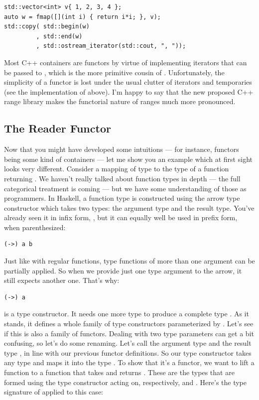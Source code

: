 \begin{Verbatim}[commandchars=\\\{\}]
std::vector<int> v{ 1, 2, 3, 4 };
auto w = fmap([](int i) { return i*i; }, v);
std::copy( std::begin(w)
         , std::end(w)
         , std::ostream_iterator(std::cout, ", "));
\end{Verbatim}
Most C++ containers are functors by virtue of implementing iterators
that can be passed to , which is the more
primitive cousin of . Unfortunately, the simplicity of a
functor is lost under the usual clutter of iterators and temporaries
(see the implementation of  above). I'm happy to say that
the new proposed C++ range library makes the functorial nature of ranges
much more pronounced.

\subsection{The Reader Functor}\label{the-reader-functor}

Now that you might have developed some intuitions --- for instance,
functors being some kind of containers --- let me show you an example
which at first sight looks very different. Consider a mapping of type
 to the type of a function returning . We haven't
really talked about function types in depth --- the full categorical
treatment is coming --- but we have some understanding of those as
programmers. In Haskell, a function type is constructed using the arrow
type constructor \code{(->)} which takes two types: the
argument type and the result type. You've already seen it in infix form,
, but it can equally well be used in prefix
form, when parenthesized:

\begin{Verbatim}[commandchars=\\\{\}]
(->) a b
\end{Verbatim}
Just like with regular functions, type functions of more than one
argument can be partially applied. So when we provide just one type
argument to the arrow, it still expects another one. That's why:

\begin{Verbatim}[commandchars=\\\{\}]
(->) a
\end{Verbatim}
is a type constructor. It needs one more type  to produce a
complete type . As it stands, it defines a
whole family of type constructors parameterized by . Let's see
if this is also a family of functors. Dealing with two type parameters
can get a bit confusing, so let's do some renaming. Let's call the
argument type  and the result type , in line with
our previous functor definitions. So our type constructor takes any type
 and maps it into the type . To show
that it's a functor, we want to lift a function
 to a function that takes
 and returns . These
are the types that are formed using the type constructor
 acting on, respectively,  and
. Here's the type signature of  applied to this
case:

